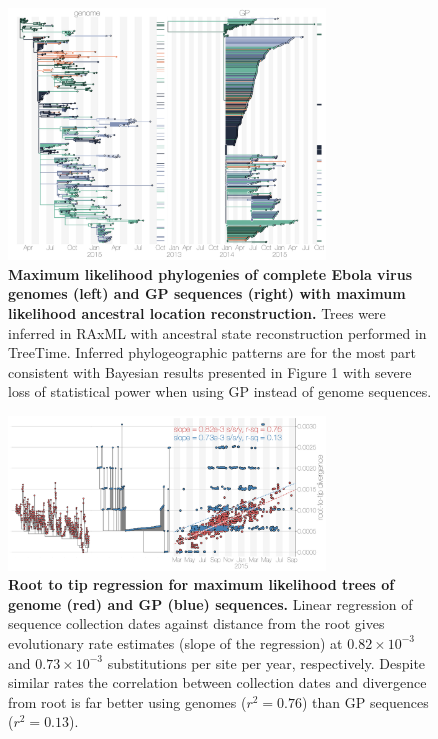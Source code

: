 \documentclass[11pt,oneside,letterpaper]{article}
\begin{document}
\begin{figure}[h]
 \centering
	\includegraphics[width=0.75\textwidth]{supp_figures/sfig2_treetimeTrees.png}
	\caption{\textbf{Maximum likelihood phylogenies of complete Ebola virus genomes (left) and GP sequences (right) with maximum likelihood ancestral location reconstruction.}
  Trees were inferred in RAxML with ancestral state reconstruction performed in TreeTime.
  Inferred phylogeographic patterns are for the most part consistent with Bayesian results presented in Figure 1 with severe loss of statistical power when using GP instead of genome sequences.
	}
	\label{TTtrees}
\end{figure}

\begin{figure}[h]
 \centering
	\includegraphics[width=0.75\textwidth]{supp_figures/sfig3_rtt.png}
	\caption{\textbf{Root to tip regression for maximum likelihood trees of genome (red) and GP (blue) sequences.}
  Linear regression of sequence collection dates against distance from the root gives evolutionary rate estimates (slope of the regression) at $0.82\times10^{-3}$ and $0.73\times10^{-3}$ substitutions per site per year, respectively.
  Despite similar rates the correlation between collection dates and divergence from root is far better using genomes ($r^{2}=0.76$) than GP sequences ($r^{2}=0.13$).
	}
	\label{rtt}
\end{figure}
\end{document}
